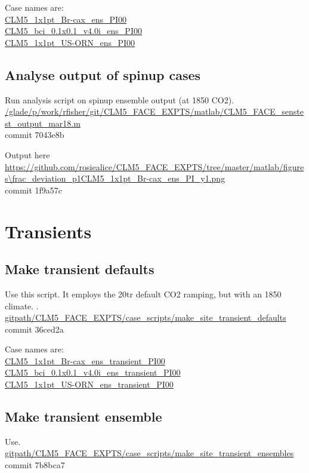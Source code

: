\documentclass{article}
\begin{document}
Case names are:\\
{\color{cyan}\small{\url{CLM5_1x1pt_Br-cax_ens_PI00}}}\\
{\color{cyan}\small{\url{CLM5_bci_0.1x0.1_v4.0i_ens_PI00}}}\\
{\color{cyan}\small{\url{CLM5_1x1pt_US-ORN_ens_PI00}}}

\subsection{Analyse output of spinup cases}

Run analysis script on spinup ensemble output (at 1850 CO2). \\
{\color{blue}\small{\url{/glade/p/work/rfisher/git/CLM5_FACE_EXPTS/matlab/CLM5_FACE_senstest_output_mar18.m}}}\\
commit 7043e8b  

Output here\\
{\color{magenta}\small{\url{https://github.com/rosiealice/CLM5_FACE_EXPTS/tree/master/matlab/figures\frac_deviation_p1CLM5_1x1pt_Br-cax_ens_PI_y1.png}}}\\
commit 1f9a57c  

\section{Transients}

\subsection{Make transient defaults}
Use this script. It employs the 20tr default CO2 ramping, but with an 1850 climate. .\\
{\color{blue}\small{\url{gitpath/CLM5_FACE_EXPTS/case_scripts/make_site_transient_defaults}}}\\
commit 36ced2a

Case names are:\\
{\color{cyan}\small{\url{CLM5_1x1pt_Br-cax_ens_transient_PI00}}}\\
{\color{cyan}\small{\url{CLM5_bci_0.1x0.1_v4.0i_ens_transient_PI00}}}\\
{\color{cyan}\small{\url{CLM5_1x1pt_US-ORN_ens_transient_PI00}}}

\subsection{Make transient ensemble}
Use.\\
{\color{blue}\small{\url{gitpath/CLM5_FACE_EXPTS/case_scripts/make_site_transient_ensembles}}}\\
commit 7b8bca7
\end{document}

